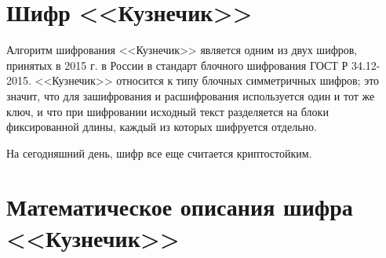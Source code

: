 \documentclass[a4paper, 12pt]{article}
\begin{document}
    \section{Шифр <<Кузнечик>>}

    Алгоритм шифрования <<Кузнечик>> является одним из двух шифров, принятых в 2015 г.
    в России в стандарт блочного шифрования ГОСТ Р 34.12-2015. <<Кузнечик>> относится
    к типу блочных симметричных шифров; это значит, что для зашифрования и
    расшифрования используется один и тот же ключ, и что при шифровании исходный текст
    разделяется на блоки фиксированной длины, каждый из которых шифруется отдельно.

    На сегодняшний день, шифр все еще считается криптостойким.

    \section{Математическое описания шифра <<Кузнечик>>}

    

\end{document}
